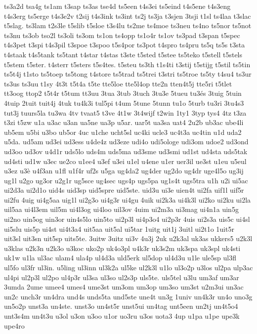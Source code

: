 {ts3a2d
tsa4g
ts1am
t3sap
ts3as
tse4d
ts5een
t4s3ei
ts5eind
t4s5ene
t4s3eng
t4s3erg
ts5erge
t4s3e2v
t2sij
t4s3ink
ts3int
ts2j
ts3ja
t3sjen
3tsji
t1sl
ts4laa
t3slac
t5slag.
ts3lam
t2s3le
t5slib
t5sloe
t3s4lu
ts2me
ts4moe
ts3neu
ts4no
ts5nor
ts5not
ts3nu
ts3ob
tso2l
ts3oli
ts3om
ts1on
ts4opp
ts1o4r
ts1ov
ts3pad
t3span
t5spec
t4s3pet
t3spi
t4s3pil
t3spoe
t3spoo
t5s4por
ts3pot
t4spro
ts4pru
ts5q
ts5s
t3sta
t4staak
t4s5tank
ts5tant
t4star
t4stas
t3ste
t5sted
t5stee
ts5teko
t5stell
t5stels
t5stem
t5ster.
t4sterr
t5sters
t5s4tes.
t5steu
ts3th
t1s4ti
t3stij
t5stijg
t5stil
ts5tin
ts5t4j
t1sto
ts5toep
ts5tong
t4store
ts5trad
ts5trei
t3stri
ts5troe
ts5ty
t4su4
ts3ur
ts3us
ts3uu
t1sy
4t3t
t5t4a
t5te
tte5loe
tte5l4op
tte2n
tten4t5j
tte5ri
t5tlet
tt3oog
ttop2
t5t4r
t5tum
tt3uu
3tua
3tub
3tuch
3tu3e
5tueu
tu3és
3tuig
5tuin
4tuip
2tuit
tuit4j
4tuk
tu4k3i
tul5pi
t4um
5tune
5tunn
tu1o
5turb
tu3ri
3tu4s3
tut3j
tuurs5la
tu3wa
4tv
tvaat5
t3ve
4t1w
3t4wijf
t2win
1ty1
3typ
tys4
4tz
t3za
t3zi
t5zw
u1a
u3ac
u3an
ua5ne
ua3p
u5ar.
uar5t
ua3sa
uat4
2u2b
ub3ac
ube4li
ub5em
u5bi
u3bo
ub5or
4uc
u1che
ucht5sl
uc4ki
ucle3
uc4t3a
uc4tin
u1d
uda2
u5da.
ud5am
ud3ei
ud3ess
u4de4z
ud3eze
udi4o
udi5ologe
udi3om
udoe2
ud3ond
ud3oo
ud3ov
u4d1r
uds5lo
uds4m
uds5ma
ud3sme
ud3smi
ud1st
ud4sta
uds5tak
ud4sti
ud1w
u3ec
ue2co
u1ee4
u3ef
u3ei
u1el
u4ene
u1er
uer3il
ue3st
u1eu
u5eul
u3ez
u3è
u4f3an
u1fl
u1f4r
uf2s
u5ga
ug4da2
ug4der
ug2do
ug4dr
uge4l5o
ug3ij
ug1l
u2go
ug3or
u2g1r
ug5sce
ug4sec
ugs4p
ugs5pa
ug1s4t
ugs5tra
u1h
u2i
ui5ac
ui2d3a
ui2d1o
uid4s
uid3sp
uid5spre
uid5ste.
uid3u
ui3e
uien4t
ui2fa
uif1l
uif5r
ui2fu
4uig
ui4g5aa
uig1l
ui2g3o
ui4g3r
ui4gu
4uik
ui2k3a
ui4k3l
ui2ko
ui2ku
ui2la
uil5aa
ui4l3em
uil5m
ui4l3og
ui4loo
uil3ov
4uim
ui2m3a
ui3mag
ui4n1a
uin5g
ui2no
uin5og
uin3or
uin4s5lo
uin5to
ui2p3l
ui4p3o4
ui2p3r
4uis
ui2s3a
uis5c
ui4sl
ui5slu
uis5p
ui4st
ui4t3a4
uit5aa
uit5al
ui5tar
1uitg
uit1j
3uitl
ui2t1o
1uit5r
uit3sl
uit3sn
uit5sp
uits5te.
3uitw
3uitz
ui3v
4u3j
2uk
u2k3al
uk3as
ukkers5
u2k3l
u3klas
u2k3n
u2k3o
u3koc
uko2p
uk4o3pl
u4k3r
uk3s2m
uk3spa
uk3spl
uk4sti
uk1w
u1la
ul3ac
ulam4
ula4p
ul4d3a
uld5erk
ul5dop
ul4d3u
u1le
ule5sp
ul3fl
ul5fo
ul3fr
ul3in.
u5ling
ul3inn
ul3k2a
ul5ke
ul2k3l
u1lo
ul3o2p
u3los
ul2pa
ulp3ac
ul4pi
ul2p3l
ul2po
ul4p3r
ul3sa
ul3so
ul2s3p
uls5te.
uls5tel
u3lu
um3af
um3ar
3umda
2ume
umee4
umes4
ume3st
um3om
um3op
um3so
um3st
u2m3ui
un3ac
un2c
unch3r
un4dra
und4s
unds5ta
und5ste
une4t
un3g
1univ
un4k3r
un4o
uno3g
un5o2p
unst3a
un4ste.
unst3o
un4st5r
unst5ui
un4tag
unt5een
un2tj
un4t5o4
unt3s4m
un4t3u
u3ol
u3on
u3oo
u1or
uo3ru
u3os
uota3
4up
u1pa
u1pe
upe3k
upe4ro
}
